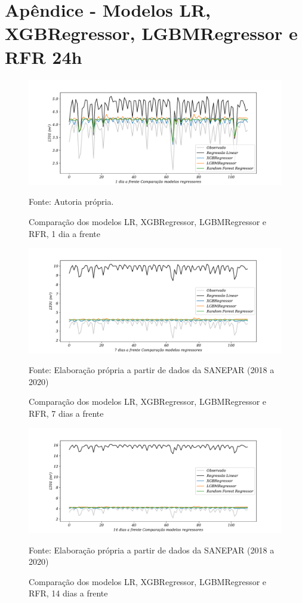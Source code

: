 
\section{Ap\^endice - Modelos LR, XGBRegressor, LGBMRegressor e RFR 24h}\label{sec:lrxgblgbmrf24}

\begin{figure}[H]
	\centering
	\caption{Comparação dos modelos LR, XGBRegressor, LGBMRegressor e RFR, 1 dia a frente }
	\label{fig:1-LR-XGB-LGBM-RF24}
	\includegraphics[width=1\linewidth]{Apendices/Figuras/modelagem-24h/1-LR-XGB-LGBM-RF}
	
	Fonte: Autoria própria.
\end{figure}

\begin{figure}[H]
	\centering
	\caption{Comparação dos modelos LR, XGBRegressor, LGBMRegressor e RFR, 7 dias a frente }
	\label{fig:10-LR-XGB-LGBM-RF24}
	\includegraphics[width=1\linewidth]{Apendices/Figuras/modelagem-24h/7-LR-XGB-LGBM-RF}
	
Fonte: Elaboração própria a partir de dados da SANEPAR (2018 a 2020)
\end{figure}


\begin{figure}[H]
	\centering
	\caption{Comparação dos modelos LR, XGBRegressor, LGBMRegressor e RFR, 14 dias a frente }
	\label{fig:30-LR-XGB-LGBM-RF24}
	\includegraphics[width=1\linewidth]{Apendices/Figuras/modelagem-24h/14-LR-XGB-LGBM-RF}
	
Fonte: Elaboração própria a partir de dados da SANEPAR (2018 a 2020)
\end{figure}

